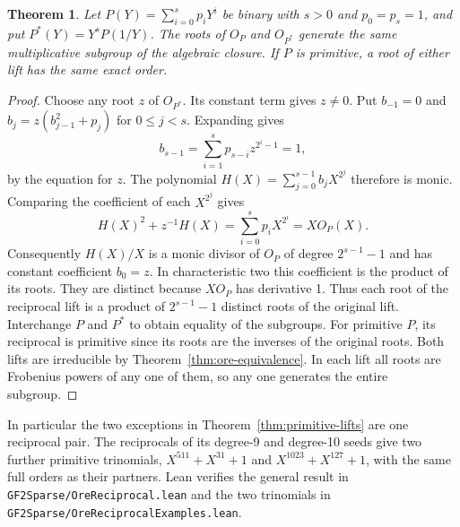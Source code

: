 \documentclass[11pt]{article}
\newtheorem{theorem}{Theorem}
\begin{document}
\begin{theorem}\label{thm:ore-reciprocal-orders}
Let \(P(Y)=\sum_{i=0}^s p_iY^i\) be binary with \(s>0\) and
\(p_0=p_s=1\), and put \(P^*(Y)=Y^sP(1/Y)\).
The roots of \(O_P\) and \(O_{P^*}\) generate the same multiplicative
subgroup of the algebraic closure. If \(P\) is primitive, a root of
either lift has the same exact order.
\end{theorem}
\begin{proof}
Choose any root \(z\) of \(O_{P^*}\). Its constant term gives
\(z\ne0\). Put \(b_{-1}=0\) and
\(b_j=z(b_{j-1}^2+p_j)\) for \(0\le j<s\). Expanding gives
\[
 b_{s-1}=\sum_{i=1}^s p_{s-i}z^{2^i-1}=1,
\]
by the equation for \(z\). The polynomial
\(H(X)=\sum_{j=0}^{s-1}b_jX^{2^j}\) therefore is monic.
Comparing the coefficient of each \(X^{2^j}\) gives
\[
 H(X)^2+z^{-1}H(X)=\sum_{i=0}^s p_iX^{2^i}=X O_P(X).
\]
Consequently \(H(X)/X\) is a monic divisor of \(O_P\) of degree
\(2^{s-1}-1\) and has constant coefficient \(b_0=z\).
In characteristic two this coefficient is the product of its roots.
They are distinct because \(X O_P\) has derivative 1. Thus each
root of the reciprocal lift is a product of \(2^{s-1}-1\) distinct
roots of the original lift. Interchange \(P\) and \(P^*\) to obtain equality
of the subgroups. For primitive \(P\), its reciprocal is primitive
since its roots are the inverses of the original roots. Both lifts
are irreducible by Theorem~\ref{thm:ore-equivalence}. In each lift
all roots are Frobenius powers of any one of them, so any one
generates the entire subgroup.
\end{proof}

In particular the two exceptions in Theorem~\ref{thm:primitive-lifts}
are one reciprocal pair. The reciprocals of its degree-9 and degree-10
seeds give two further primitive trinomials, \(X^{511}+X^{31}+1\)
and \(X^{1023}+X^{127}+1\), with the same full orders as their partners.
Lean verifies the general result in \nolinkurl{GF2Sparse/OreReciprocal.lean}
and the two trinomials in \nolinkurl{GF2Sparse/OreReciprocalExamples.lean}.
\end{document}
